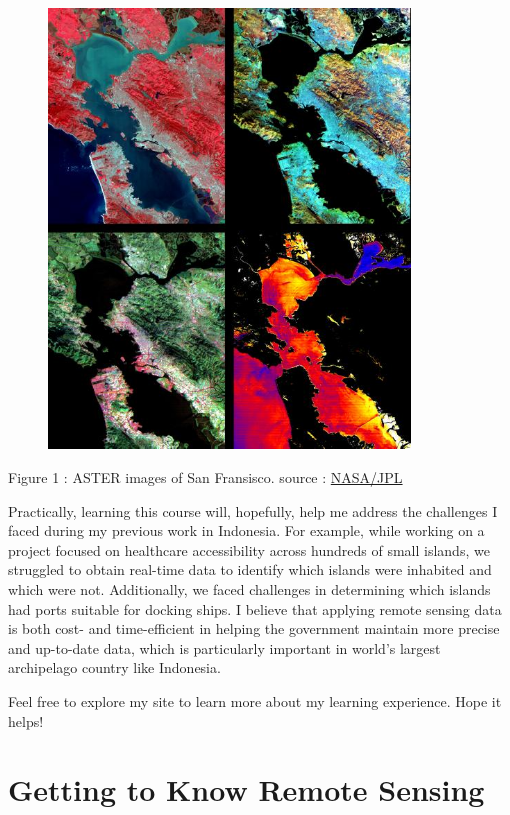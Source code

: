 \documentclass[
  letterpaper,
  DIV=11,
  numbers=noendperiod]{scrreprt}
\begin{document}
\begin{figure}

\href{https://photojournal.jpl.nasa.gov/jpegMod/PIA02605_modest.jpg}{\includegraphics[width=3.78125in,height=\textheight]{images/PIA02605_modest.jpg}}

\end{figure}

Figure 1 : ASTER images of San Fransisco. source :
\href{https://photojournal.jpl.nasa.gov/catalog/PIA02605}{NASA/JPL}

Practically, learning this course will, hopefully, help me address the
challenges I faced during my previous work in Indonesia. For example,
while working on a project focused on healthcare accessibility across
hundreds of small islands, we struggled to obtain real-time data to
identify which islands were inhabited and which were not. Additionally,
we faced challenges in determining which islands had ports suitable for
docking ships. I believe that applying remote sensing data is both cost-
and time-efficient in helping the government maintain more precise and
up-to-date data, which is particularly important in world's largest
archipelago country like Indonesia.

Feel free to explore my site to learn more about my learning experience.
Hope it helps!


\hypertarget{getting-to-know-remote-sensing}{%
\chapter{Getting to Know Remote
Sensing}\label{getting-to-know-remote-sensing}}
\end{document}
